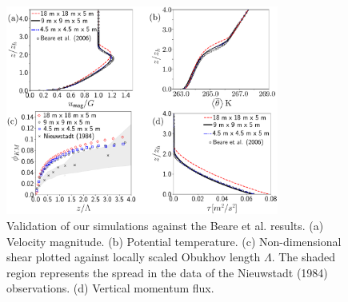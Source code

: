 \documentclass[%
 aip,
 amsmath,amssymb,
preprint,%
author-numerical,%
]{revtex4-1}
\begin{document}
\begin{figure}[h!]
 \centering
 \includegraphics[width=0.8\textwidth]{grid_independence_final.pdf}
 \vspace{-0.4cm}
 \caption{Validation of our simulations against the Beare et al.\cite{bea06} results. (a) Velocity magnitude. (b) Potential temperature. (c) Non-dimensional shear plotted against locally scaled Obukhov length $\Lambda$. The shaded region represents the spread in the data of the Nieuwstadt (1984) \cite{nie84} observations. (d) Vertical momentum flux.}
 \label{fig:grid}
\end{figure}



\end{document}
